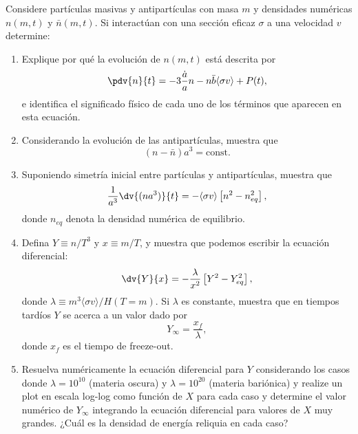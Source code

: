 \documentclass[../main]{subfiles}
\begin{document}
\begin{adjustwidth}{0pt}{-100pt}
\begin{enumerate}
    Considere partículas masivas y antipartículas con masa $m$ y densidades numéricas $n(m, t)$ y $\bar{n}(m ,t)$. Si interactúan con una sección eficaz $\sigma$ a una velocidad $v$ determine:
    \begin{enumerate}
        \item Explique por qué la evolución de $n(m, t)$ está descrita por 
        \begin{equation}
            \pdv{n}{t}=-3\dfrac{\dot{a}}{a}n-n\bar{b}\langle \sigma v\rangle+P(t),
        \end{equation}
        e identifica el significado físico de cada uno de los términos que aparecen en esta ecuación.
        \item Considerando la evolución de las antipartículas, muestra que 
        \begin{equation}
            (n-\bar{n})a^3 = \text{const}.
        \end{equation}
        \item Suponiendo simetría inicial entre partículas y antipartículas, muestra que 
        \begin{equation}
            \dfrac{1}{a^3}\dv{(na^3)}{t}=-\langle \sigma v\rangle \left[n^2-n^2_{eq}\right],
        \end{equation}
        donde $n_{eq}$ denota la densidad numérica de equilibrio.
        \item Defina $Y \equiv n/T^3$ y $x \equiv m/T$, y muestra que podemos escribir la ecuación diferencial:
        \begin{equation}
            \dv{Y}{x}=-\dfrac{\lambda}{x^2}\left[Y^2-Y^2_{eq}\right],
        \end{equation}
        donde $\lambda \equiv m^3 \langle \sigma v\rangle/ H(T=m)$. Si $\lambda$ es constante, muestra que en tiempos tardíos $Y$ se acerca a un valor dado por 
        \begin{equation}
            Y_{\infty}=\dfrac{x_f}{\lambda},
        \end{equation}
        donde $x_f$ es el tiempo de freeze-out.
        \item Resuelva numéricamente la ecuación diferencial para $Y$ considerando los casos donde $\lambda = 10^{10}$ (materia oscura) y $\lambda=10^{20}$ (materia bariónica) y realize un plot en escala log-log como función de $X$ para cada caso y determine el valor numérico de $Y_{\infty}$ integrando la ecuación diferencial para valores de $X$ muy grandes. ¿Cuál es la densidad de energía reliquia en cada caso?
    \end{enumerate}
\end{enumerate}
\end{adjustwidth}
\end{document}
